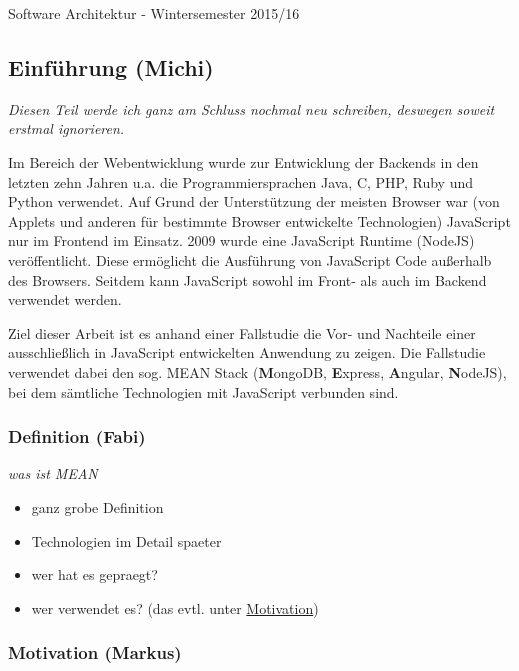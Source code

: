 \documentclass[]{article}
\begin{document}
Software Architektur - Wintersemester 2015/16

\subsection{Einführung (Michi)}\label{einfuxfchrung-michi}

\emph{Diesen Teil werde ich ganz am Schluss nochmal neu schreiben,
deswegen soweit erstmal ignorieren.}

Im Bereich der Webentwicklung wurde zur Entwicklung der Backends in den
letzten zehn Jahren u.a. die Programmiersprachen Java, C, PHP, Ruby und
Python verwendet. Auf Grund der Unterstützung der meisten Browser war
(von Applets und anderen für bestimmte Browser entwickelte Technologien)
JavaScript nur im Frontend im Einsatz. 2009 wurde eine JavaScript
Runtime (NodeJS) veröffentlicht. Diese ermöglicht die Ausführung von
JavaScript Code außerhalb des Browsers. Seitdem kann JavaScript sowohl
im Front- als auch im Backend verwendet werden.

Ziel dieser Arbeit ist es anhand einer Fallstudie die Vor- und Nachteile
einer ausschließlich in JavaScript entwickelten Anwendung zu zeigen. Die
Fallstudie verwendet dabei den sog. MEAN Stack (\textbf{M}ongoDB,
\textbf{E}xpress, \textbf{A}ngular, \textbf{N}odeJS), bei dem sämtliche
Technologien mit JavaScript verbunden sind.

\subsubsection{Definition (Fabi)}\label{definition-fabi}

\emph{was ist MEAN}

\begin{itemize}
\itemsep1pt\parskip0pt
\item
  ganz grobe Definition
\item
  Technologien im Detail spaeter
\item
  wer hat es gepraegt?
\item
  wer verwendet es? (das evtl. unter \hyperref[motivation]{Motivation})
\end{itemize}

\subsubsection{Motivation (Markus)}\label{motivation-markus}
\end{document}
